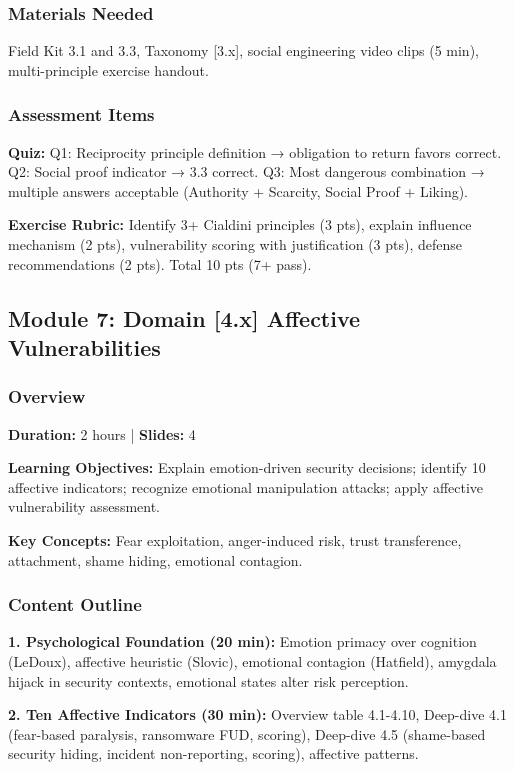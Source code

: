 \documentclass[11pt,a4paper]{article}
\begin{document}
\subsubsection{Materials Needed}
Field Kit 3.1 and 3.3, Taxonomy [3.x], social engineering video clips (5 min), multi-principle exercise handout.

\subsubsection{Assessment Items}
\textbf{Quiz:} Q1: Reciprocity principle definition → obligation to return favors correct. Q2: Social proof indicator → 3.3 correct. Q3: Most dangerous combination → multiple answers acceptable (Authority + Scarcity, Social Proof + Liking).

\textbf{Exercise Rubric:} Identify 3+ Cialdini principles (3 pts), explain influence mechanism (2 pts), vulnerability scoring with justification (3 pts), defense recommendations (2 pts). Total 10 pts (7+ pass).

\subsection{Module 7: Domain [4.x] Affective Vulnerabilities}

\subsubsection{Overview}
\textbf{Duration:} 2 hours | \textbf{Slides:} 4

\textbf{Learning Objectives:} Explain emotion-driven security decisions; identify 10 affective indicators; recognize emotional manipulation attacks; apply affective vulnerability assessment.

\textbf{Key Concepts:} Fear exploitation, anger-induced risk, trust transference, attachment, shame hiding, emotional contagion.

\subsubsection{Content Outline}
\textbf{1. Psychological Foundation (20 min):} Emotion primacy over cognition (LeDoux), affective heuristic (Slovic), emotional contagion (Hatfield), amygdala hijack in security contexts, emotional states alter risk perception.

\textbf{2. Ten Affective Indicators (30 min):} Overview table 4.1-4.10, Deep-dive 4.1 (fear-based paralysis, ransomware FUD, scoring), Deep-dive 4.5 (shame-based security hiding, incident non-reporting, scoring), affective patterns.
\end{document}

